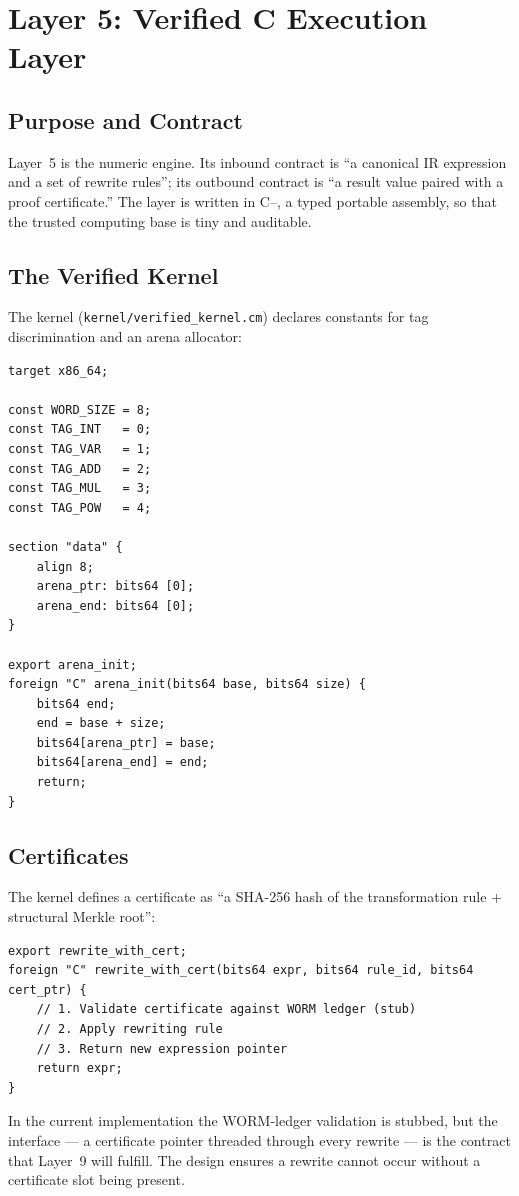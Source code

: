\chapter{Layer 5: Verified C{\textendash}{\textendash} Execution Layer}
\label{ch:cmm}

\section{Purpose and Contract}
\label{sec:cmm-purpose}

Layer~5 is the numeric engine. Its inbound contract is ``a canonical IR
expression and a set of rewrite rules''; its outbound contract is ``a result
value paired with a proof certificate.'' The layer is written in C{--}, a
typed portable assembly, so that the trusted computing base is tiny and
auditable.

\section{The Verified Kernel}
\label{sec:cmm-kernel}

The kernel (\texttt{kernel/verified\_kernel.cm}) declares constants for tag
discrimination and an arena allocator:
\begin{lstlisting}[language=CM,caption={Tags and arena (verified\_kernel.cm).},label=lst:cmm-head]
target x86_64;

const WORD_SIZE = 8;
const TAG_INT   = 0;
const TAG_VAR   = 1;
const TAG_ADD   = 2;
const TAG_MUL   = 3;
const TAG_POW   = 4;

section "data" {
    align 8;
    arena_ptr: bits64 [0];
    arena_end: bits64 [0];
}

export arena_init;
foreign "C" arena_init(bits64 base, bits64 size) {
    bits64 end;
    end = base + size;
    bits64[arena_ptr] = base;
    bits64[arena_end] = end;
    return;
}
\end{lstlisting}

\section{Certificates}
\label{sec:cmm-cert}

The kernel defines a certificate as ``a SHA-256 hash of the transformation
rule + structural Merkle root'':
\begin{lstlisting}[language=CM,caption={Certified rewriting (verified\_kernel.cm).},label=lst:cmm-cert]
export rewrite_with_cert;
foreign "C" rewrite_with_cert(bits64 expr, bits64 rule_id, bits64 cert_ptr) {
    // 1. Validate certificate against WORM ledger (stub)
    // 2. Apply rewriting rule
    // 3. Return new expression pointer
    return expr;
}
\end{lstlisting}
In the current implementation the WORM-ledger validation is stubbed, but the
interface --- a certificate pointer threaded through every rewrite --- is the
contract that Layer~9 will fulfill. The design ensures a rewrite cannot occur
without a certificate slot being present.


